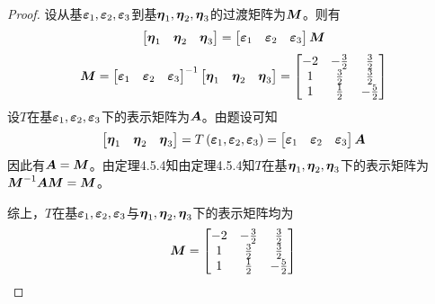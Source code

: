 \begin{proof}
    设从基\(\boldsymbol{\varepsilon}_1,\boldsymbol{\varepsilon}_2,\boldsymbol{\varepsilon}_3\)到基\(\boldsymbol{\eta}_1,\boldsymbol{\eta}_2,\boldsymbol{\eta}_3\)的过渡矩阵为\(\boldsymbol{M}\)。则有
    \begin{equation*}
        \begin{bmatrix}\boldsymbol{\eta}_1&\boldsymbol{\eta}_2&\boldsymbol{\eta}_3\end{bmatrix}=
        \begin{bmatrix}\boldsymbol{\varepsilon}_1&\boldsymbol{\varepsilon}_2&\boldsymbol{\varepsilon}_3\end{bmatrix}\boldsymbol{M}
    \end{equation*}
    \begin{equation*}
        \boldsymbol{M}={\begin{bmatrix}\boldsymbol{\varepsilon}_1&\boldsymbol{\varepsilon}_2&\boldsymbol{\varepsilon}_3\end{bmatrix}}^{-1}\begin{bmatrix}\boldsymbol{\eta}_1&\boldsymbol{\eta}_2&\boldsymbol{\eta}_3\end{bmatrix}=
        \begin{bmatrix}
            -2 & -\frac{3}{2} & \frac{3}{2}  \\
            1  & \frac{3}{2}  & \frac{3}{2}  \\
            1  & \frac{1}{2}  & -\frac{5}{2}
        \end{bmatrix}
    \end{equation*}
    设\(T\)在基\(\boldsymbol{\varepsilon}_1,\boldsymbol{\varepsilon}_2,\boldsymbol{\varepsilon}_3\)下的表示矩阵为\(\boldsymbol{A}\)。由题设可知
    \begin{equation*}
        \begin{bmatrix}\boldsymbol{\eta}_1&\boldsymbol{\eta}_2&\boldsymbol{\eta}_3\end{bmatrix}=T\left( \boldsymbol{\varepsilon}_1,\boldsymbol{\varepsilon}_2,\boldsymbol{\varepsilon}_3 \right)=\begin{bmatrix}\boldsymbol{\varepsilon}_1&\boldsymbol{\varepsilon}_2&\boldsymbol{\varepsilon}_3\end{bmatrix}\boldsymbol{A}
    \end{equation*}
    因此有\(\boldsymbol{A}=\boldsymbol{M}\)。由定理4.5.4知由定理4.5.4知\(T\)在基\(\boldsymbol{\eta}_1,\boldsymbol{\eta}_2,\boldsymbol{\eta}_3\)下的表示矩阵为\({\boldsymbol{M}}^{-1}\boldsymbol{A}\boldsymbol{M}=\boldsymbol{M}\)。

    综上，\(T\)在基\(\boldsymbol{\varepsilon}_1,\boldsymbol{\varepsilon}_2,\boldsymbol{\varepsilon}_3\)与\(\boldsymbol{\eta}_1,\boldsymbol{\eta}_2,\boldsymbol{\eta}_3\)下的表示矩阵均为
    \begin{equation*}
        \boldsymbol{M}=
        \begin{bmatrix}
            -2 & -\frac{3}{2} & \frac{3}{2}  \\
            1  & \frac{3}{2}  & \frac{3}{2}  \\
            1  & \frac{1}{2}  & -\frac{5}{2}
        \end{bmatrix}
    \end{equation*}
\end{proof}